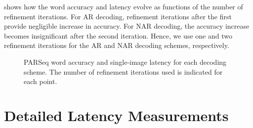  shows how the word accuracy and latency evolve as functions of the number of refinement iterations. For AR decoding, refinement iterations after the first provide negligible increase in accuracy. For NAR decoding, the accuracy increase becomes insignificant after the second iteration. Hence, we use one and two refinement iterations for the AR and NAR decoding schemes, respectively.

\begin{figure}[htbp]
  \centering


  \caption[PARSeq word accuracy and single-image latency for each decoding scheme.]{PARSeq word accuracy and single-image latency for each decoding scheme. The number of refinement iterations used is indicated for each point.}
  \label{fig:ablation-decoding}
\end{figure}

\section{Detailed Latency Measurements}
\label{ch:latency-measurements}

